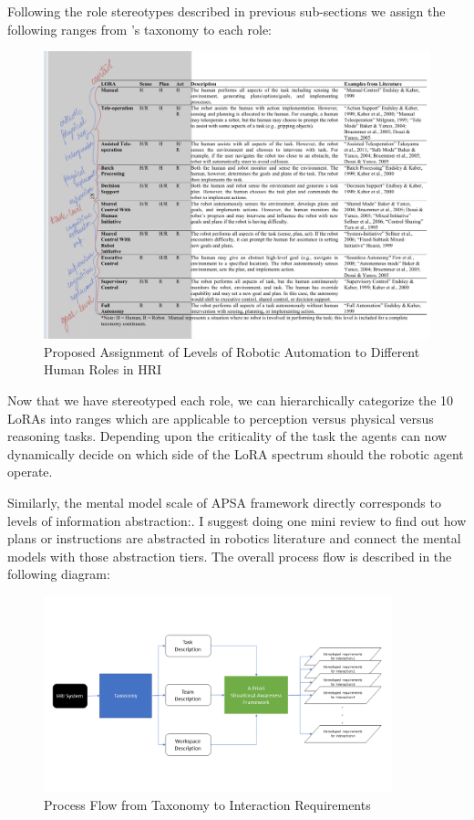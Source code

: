 \documentclass[letterpaper, 10 pt, conference]{ieeeconf} %
\theoremstyle{definition} \newtheorem{definition}{Definition}
\begin{document}
Following the role stereotypes described in previous sub-sections we assign the
following ranges from \citeauthor{Beer2014toward}'s taxonomy to each role:

\begin{figure}[]
      \centering
      \includegraphics{lora_apsa.jpg}  
      \caption{Proposed Assignment of Levels of Robotic Automation to Different Human Roles in HRI}
      \label{fig:lora-apsa}
\end{figure}

Now that we have stereotyped each role, we can hierarchically categorize the 10
LoRAs into ranges which are applicable to perception versus physical versus
reasoning tasks. Depending upon the criticality of the task the agents can now
dynamically decide on which side of the LoRA spectrum should the robotic agent
operate.

Similarly, the mental model scale of APSA framework directly corresponds to
levels of information abstraction:. I suggest doing one mini review to find out
how plans or instructions are abstracted in robotics literature and connect the
mental models with those abstraction tiers. The overall process flow is
described in the following diagram:

\begin{figure}[t!]
  \includegraphics[width=0.9\textwidth]{apsa.png}
  \caption{Process Flow from Taxonomy to Interaction Requirements}
\end{figure}
\end{document}
